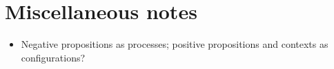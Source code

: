 \chapter{Miscellaneous notes}

\begin{itemize}
\item Negative propositions as processes; positive propositions and contexts as configurations?
\end{itemize}

